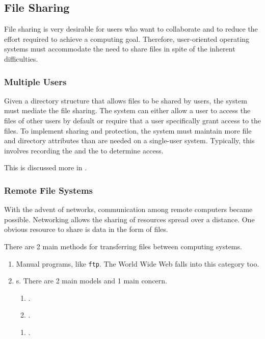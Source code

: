 \subsection{File Sharing}\label{subsec:File_Sharing}
File sharing is very desirable for users who want to collaborate and to reduce the effort required to achieve a computing goal.
Therefore, user-oriented operating systems must accommodate the need to share files in spite of the inherent difficulties.

\subsubsection{Multiple Users}\label{subsubsec:File_Sharing-Multiple_Users}
Given a directory structure that allows files to be shared by users, the system must mediate the file sharing.
The system can either allow a user to access the files of other users by default or require that a user specifically grant access to the files.
To implement sharing and protection, the system must maintain more file and directory attributes than are needed on a single-user system.
Typically, this involves recording the  and the  to determine access.

This is discussed more in .

\subsubsection{Remote File Systems}\label{subsubsec:Remote_File_Systems}
With the advent of networks, communication among remote computers became possible.
Networking allows the sharing of resources spread over a distance.
One obvious resource to share is data in the form of files.

There are 2 main methods for transferring files between computing systems.
\begin{enumerate}[noitemsep]
\item Manual programs, like \texttt{ftp}. The World Wide Web falls into this category too.
\item {}s. There are 2 main models and 1 main concern.
  \begin{enumerate}[noitemsep]
  \item {}.
  \item {}.
  \end{enumerate}
  \begin{enumerate}[noitemsep]
  \item {}.
  \end{enumerate}
\end{enumerate}

